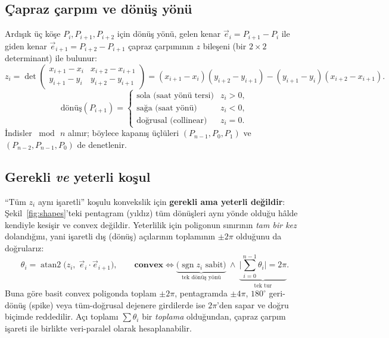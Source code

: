 \documentclass[11pt,a4paper]{article}
\begin{document}
\subsection{Çapraz çarpım ve dönüş yönü}
Ardışık üç köşe $P_i,P_{i+1},P_{i+2}$ için dönüş yönü, gelen kenar
$\vec{e}_i=P_{i+1}-P_i$ ile giden kenar $\vec{e}_{i+1}=P_{i+2}-P_{i+1}$ çapraz çarpımının
$z$ bileşeni (bir $2\times2$ determinant) ile bulunur:
\begin{equation}
z_i=\det\!\begin{pmatrix} x_{i+1}-x_i & x_{i+2}-x_{i+1}\\[2pt] y_{i+1}-y_i & y_{i+2}-y_{i+1}\end{pmatrix}
=(x_{i+1}-x_i)(y_{i+2}-y_{i+1})-(y_{i+1}-y_i)(x_{i+2}-x_{i+1}).
\end{equation}
\begin{equation}
\text{d\"on\"u\c{s}}(P_{i+1})=
\begin{cases}
\text{sola (saat yönü tersi)} & z_i>0,\\
\text{sağa (saat yönü)}       & z_i<0,\\
\text{doğrusal (collinear)}   & z_i=0.
\end{cases}
\end{equation}
İndisler $\bmod\,n$ alınır; böylece kapanış üçlüleri $(P_{n-1},P_0,P_1)$ ve $(P_{n-2},P_{n-1},P_0)$
de denetlenir.

\subsection{Gerekli \emph{ve} yeterli koşul}
``Tüm $z_i$ aynı işaretli'' koşulu konvekslik için \textbf{gerekli ama yeterli değildir}:
Şekil~\ref{fig:shapes}'teki pentagram (yıldız) tüm dönüşleri aynı yönde olduğu hâlde kendiyle
kesişir ve convex değildir. Yeterlilik için poligonun sınırının \emph{tam bir kez} dolandığını,
yani işaretli dış (dönüş) açılarının toplamının $\pm2\pi$ olduğunu da doğrularız:
\begin{equation}
\theta_i=\operatorname{atan2}\!\big(z_i,\;\vec{e}_i\cdot\vec{e}_{i+1}\big),\qquad
\textbf{convex}\iff
\underbrace{\big(\operatorname{sgn} z_i \text{ sabit}\big)}_{\text{tek dönüş yönü}}\ \wedge\
\underbrace{\Big|\textstyle\sum_{i=0}^{n-1}\theta_i\Big|=2\pi}_{\text{tek tur}} .
\label{eq:convex}
\end{equation}
Buna göre basit convex poligonda toplam $\pm2\pi$, pentagramda $\pm4\pi$, $180^\circ$ geri-dönüş
(spike) veya tüm-doğrusal dejenere girdilerde ise $2\pi$'den sapar ve doğru biçimde reddedilir.
Açı toplamı $\sum\theta_i$ bir \emph{toplama} olduğundan, çapraz çarpım işareti ile birlikte
veri-paralel olarak hesaplanabilir.
\end{document}
